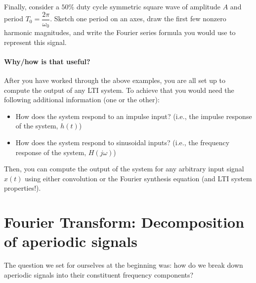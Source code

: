 

Finally, consider a $50\%$ duty cycle symmetric square wave of amplitude $A$ and period $T_0=\dfrac{2\pi}{\omega_0}$. Sketch one period on an axes, draw the first few nonzero harmonic magnitudes, and write the Fourier series formula you would use to represent this signal.


\paragraph{Why/how is that useful?}

After you have worked through the above examples, you are all set up to compute the output of any LTI system. To achieve that you would need the following additional information (one or the other): 
\begin{itemize}
    \item How does the system respond to an impulse input? (i.e., the impulse response of the system, $h(t)$)
    \item How does the system respond to sinusoidal inputs? (i.e., the frequency response of the system, $H(j\omega)$)
\end{itemize}
Then, you can compute the output of the system for any arbitrary input signal $x(t)$ using either convolution or the Fourier synthesis equation (and LTI system properties!).

\section{Fourier Transform: Decomposition of aperiodic signals}
The question we set for ourselves at the beginning was: how do we break down aperiodic signals into their constituent frequency components?

